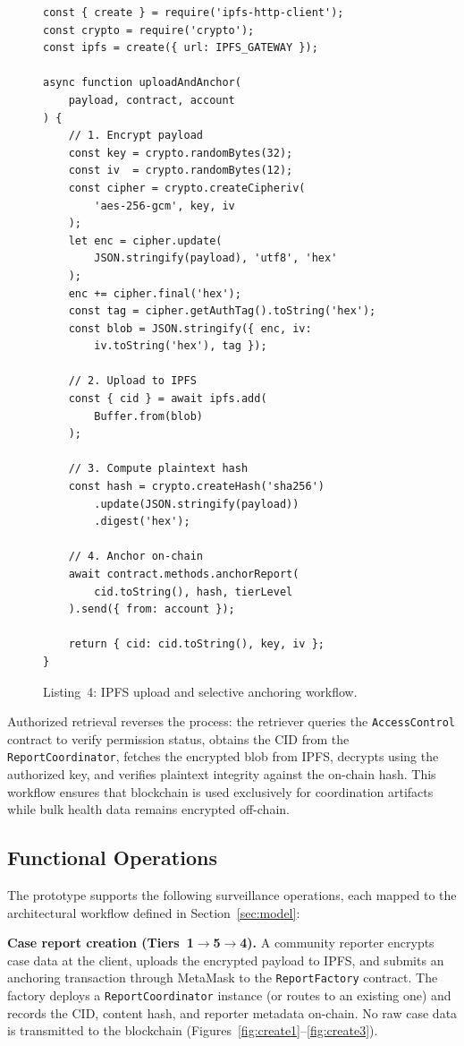 \begin{figure}[!ht]
\begin{verbatim}
const { create } = require('ipfs-http-client');
const crypto = require('crypto');
const ipfs = create({ url: IPFS_GATEWAY });

async function uploadAndAnchor(
    payload, contract, account
) {
    // 1. Encrypt payload
    const key = crypto.randomBytes(32);
    const iv  = crypto.randomBytes(12);
    const cipher = crypto.createCipheriv(
        'aes-256-gcm', key, iv
    );
    let enc = cipher.update(
        JSON.stringify(payload), 'utf8', 'hex'
    );
    enc += cipher.final('hex');
    const tag = cipher.getAuthTag().toString('hex');
    const blob = JSON.stringify({ enc, iv:
        iv.toString('hex'), tag });

    // 2. Upload to IPFS
    const { cid } = await ipfs.add(
        Buffer.from(blob)
    );

    // 3. Compute plaintext hash
    const hash = crypto.createHash('sha256')
        .update(JSON.stringify(payload))
        .digest('hex');

    // 4. Anchor on-chain
    await contract.methods.anchorReport(
        cid.toString(), hash, tierLevel
    ).send({ from: account });

    return { cid: cid.toString(), key, iv };
}
\end{verbatim}
\caption*{Listing~4: IPFS upload and selective anchoring workflow.}\label{lst:ipfs}
\end{figure}

Authorized retrieval reverses the process: the retriever queries the \texttt{AccessControl} contract to verify permission status, obtains the CID from the \texttt{ReportCoordinator}, fetches the encrypted blob from IPFS, decrypts using the authorized key, and verifies plaintext integrity against the on-chain hash. This workflow ensures that blockchain is used exclusively for coordination artifacts while bulk health data remains encrypted off-chain.

\subsection{Functional Operations}\label{subsec:operations}

The prototype supports the following surveillance operations, each mapped to the architectural workflow defined in Section~\ref{sec:model}:

\textbf{Case report creation (Tiers~1$\rightarrow$5$\rightarrow$4).} A community reporter encrypts case data at the client, uploads the encrypted payload to IPFS, and submits an anchoring transaction through MetaMask to the \texttt{ReportFactory} contract. The factory deploys a \texttt{ReportCoordinator} instance (or routes to an existing one) and records the CID, content hash, and reporter metadata on-chain. No raw case data is transmitted to the blockchain (Figures~\ref{fig:create1}--\ref{fig:create3}).

